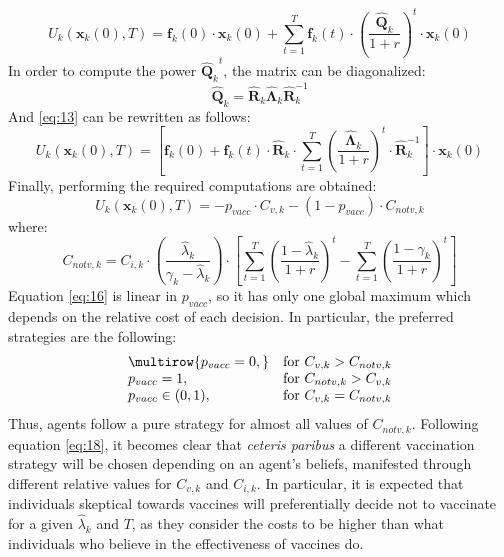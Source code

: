 \documentclass[11pt]{article}
\begin{document}
\begin{equation}\label{eq:13}
	U_k(\mathbf{x}_k(0), T) = \mathbf{f}_k(0) \cdot \mathbf{x}_k(0) + \sum_{t=1}^{T} {\mathbf{f}_k(t) \cdot   \left(\frac{ \hat{\mathbf{Q}}_k}{1+r}\right)^t \cdot \mathbf{x}_k(0) }
\end{equation}
In order to compute the power \({\hat{\mathbf{Q}}_k}^t\), the matrix can be diagonalized:
\begin{equation}\label{eq:14}
	\hat{\mathbf{Q}}_k=\hat{\mathbf{R}}_{k}\hat{\mathbf{\Lambda}}_{k}\hat{\mathbf{R}}^{-1}_{k}
\end{equation}
And \eqref{eq:13} can be rewritten as follows:
\begin{equation}\label{eq:15}
	U_k(\mathbf{x}_k(0), T)= \left[ \mathbf{f}_k(0) + \mathbf{f}_k(t) \cdot \hat{\mathbf{R}}_{k} \cdot \sum_{t=1}^{T} { \left(\frac{ \hat{\mathbf{\Lambda}}_{k}}{1+r}\right)^t \cdot \hat{\mathbf{R}}^{-1}_{k}} \right] \cdot \mathbf{x}_k(0)
\end{equation}
Finally, performing the required computations are obtained: 
\begin{equation}\label{eq:16}
	U_k(\mathbf{x}_k(0), T)=-p_{vacc} \cdot C_{v,k} - (1-p_{vacc}) \cdot C_{notv,k}
\end{equation}
where: 
\begin{equation}\label{eq:17}
	C_{notv,k}=C_{i,k} \cdot \left( \frac{\hat{\lambda}_{k}}{\gamma_{k}-\hat{\lambda}_{k}} \right) \cdot \left[\sum_{t = 1}^{T} \left(\frac{1-\hat{\lambda}_{k}}{1+r}\right)^t - \sum_{t = 1}^{T}\left(\frac{1-\gamma_k}{1+r}\right)^t\right]
\end{equation}
Equation \eqref{eq:16} is linear in \(p_{vacc}\), so it has only one global maximum which depends on the relative cost of each decision. In particular, the preferred strategies are the following:
\begin{equation}\label{eq:18}
	\begin{array}
	{@{}lr@{}}
        \multirow{p_{vacc}=0,} & \text{for }C_{v,k}>C_{notv,k} \\
        {p_{vacc}=1,} & \text{for }C_{notv,k}>C_{v,k} \\
        {p_{vacc}\in(0,1),} & \text{for }C_{v,k}=C_{notv,k} \\
    \end{array}
\end{equation}
Thus, agents follow a pure strategy for almost all values of \(C_{notv,k}\). Following equation \eqref{eq:18}, it becomes clear that \textit{ceteris paribus} a different vaccination strategy will be chosen depending on an agent's beliefs, manifested through different relative values for \(C_{v,k}\) and \(C_{i,k}\). In particular, it is expected that individuals skeptical towards vaccines will preferentially decide not to vaccinate for a given \(\hat{\lambda}_{k}\) and \(T\), as they consider the costs to be higher than what individuals who believe in the effectiveness of vaccines do.
\end{document}
